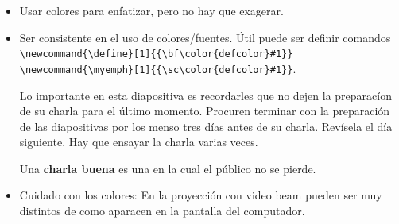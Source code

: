 \documentclass[dvipsnames,xcolor=x11names]{beamer}
\theoremstyle{plain}
\theoremstyle{definition}
\begin{document}
\begin{frame}[fragile]{}
   \newcommand{\define}[1]{{\bf\color{defcolor}#1}}
   \newcommand{\myemph}[1]{{\sc\color{bittersweet}#1}}
   \begin{itemize}
      \item Usar colores para enfatizar, pero no hay que exagerar.\pause
      \item Ser consistente en el uso de colores/fuentes.
	 \'Util puede ser definir comandos\\
	 \verb+\newcommand{\define}[1]{{\bf\color{defcolor}#1}}+\\
	 \verb+\newcommand{\myemph}[1]{{\sc\color{defcolor}#1}}+.\\
	 \smallskip
	 \pause

	 Lo importante en esta diapositiva es recordarles que
	 \myemph{no dejen la preparac\'ion de su charla para el \'ultimo momento.}
	 Procuren terminar con la preparaci\'on de las diapositivas por los menso tres d\'ias antes de su charla. Rev\'isela el d\'ia siguiente.
	 \myemph{Hay que ensayar la charla varias veces.}
	 \smallskip

	 Una \define{charla buena} es una en la cual el p\'ublico no se pierde.

      \item Cuidado con los colores: En la proyecci\'on con video beam pueden ser muy distintos de como aparacen en la pantalla del computador.

   \end{itemize}

\end{frame}
\end{document}

